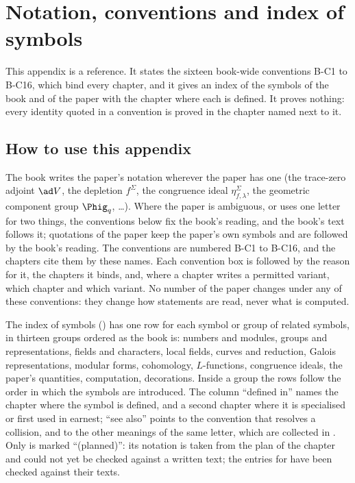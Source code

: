 \chapter{Notation, conventions and index of symbols}\label{ch:notation}

This appendix is a reference. It states the sixteen book-wide conventions B-C1 to B-C16, which bind every chapter, and it
gives an index of the symbols of the book and of the paper with the chapter where each is defined. It proves nothing: every
identity quoted in a convention is proved in the chapter named next to it.

\section{How to use this appendix}\label{sec:notation:use}

The book writes the paper's notation wherever the paper has one (the trace-zero adjoint $\ad V$, the depletion $f^\Sigma$,
the congruence ideal $\eta^\Sigma_{f,\lambda}$, the geometric component group $\Phig_q$, \dots). Where the paper is ambiguous, or
uses one letter for two things, the conventions below fix the book's reading, and the book's text follows it; quotations of the
paper keep the paper's own symbols and are followed by the book's reading. The conventions are numbered B-C1 to B-C16, and the
chapters cite them by these names. Each convention box is followed by the reason for it, the chapters it binds, and, where a
chapter writes a permitted variant, which chapter and which variant. No number of the paper changes under any of these
conventions: they change how statements are read, never what is computed.

The index of symbols () has one row for each symbol or group of related symbols, in thirteen groups
ordered as the book is: numbers and modules, groups and representations, fields and characters, local fields, curves and
reduction, Galois representations, modular forms, cohomology, $L$-functions, congruence ideals, the paper's quantities,
computation, decorations. Inside a group the rows follow the order in which the symbols are introduced. The column
``defined in'' names the chapter where the symbol is defined, and a second chapter where it is specialised or first used in
earnest; ``see also'' points to the convention that resolves a collision, and to the other meanings of the same letter, which
are collected in . Only  is marked ``(planned)'': its notation is taken from the plan
of the chapter and could not yet be checked against a written text; the entries for  have
been checked against their texts.

